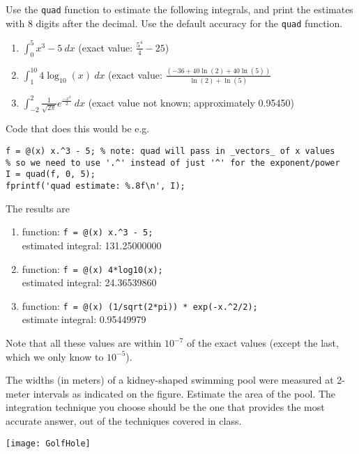 \item Use the \verb#quad# function to estimate the following
  integrals, and print the estimates with 8 digits after the decimal.
  Use the default accuracy for the \verb#quad# function.
\begin{enumerate}
\item $\displaystyle \int_0^5 x^3 - 5~dx$  (exact value: $\displaystyle \frac{5^4}{4} - 25$)
\item $\displaystyle \int_1^{10} 4 \log_{10}(x)~dx$ (exact value: 
$\displaystyle \frac{(-36+40 \ln(2)+40 \ln(5))}{\ln(2)+\ln(5)}$
\item $\displaystyle \int_{-2}^2 \frac{1}{\sqrt{2 \pi}} e^{\frac{-x^2}{2}}~dx$ (exact value not known; approximately  0.95450)
\end{enumerate}

\begin{Solution} 
Code that does this would be e.g.
\begin{verbatim}
f = @(x) x.^3 - 5; % note: quad will pass in _vectors_ of x values
% so we need to use '.^' instead of just '^' for the exponent/power
I = quad(f, 0, 5);
fprintf('quad estimate: %.8f\n', I);
\end{verbatim}
The results are
\begin{enumerate}
\item function: \verb#f = @(x) x.^3 - 5;# \\
estimated integral: 131.25000000
\item function: \verb#f = @(x) 4*log10(x);# \\
estimated integral: 24.36539860
\item function: \verb#f = @(x) (1/sqrt(2*pi)) * exp(-x.^2/2);# \\
estimate integral: 0.95449979
\end{enumerate}
Note that all these values are within $10^{-7}$ of the exact values
(except the last, which we only know to $10^{-5}$).
\end{Solution}

\item The widths (in meters) of a kidney-shaped swimming pool were
  measured at 2-meter intervals as indicated on the figure.  Estimate
  the area of the pool.  The integration technique you choose should
  be the one that provides the most accurate answer, out of the
  techniques covered in class.

  \begin{center}
    \texttt{[image: GolfHole]}
  \end{center}

